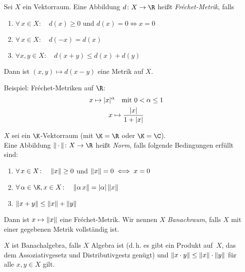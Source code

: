 \begin{thEmpty}
    Sei $X$ ein Vektorraum. Eine Abbildung $d\colon X\to\R$ heißt
    \emph{Fr\'echet-Metrik}, falls
    \begin{enumerate}[({F}1),leftmargin=2cm]
        \item
            $\forall\,x\in X\colon\quad 
            d(x) \geq 0$ und $d(x)=0 \iff x=0$
        \item
            $\forall\,x\in X\colon\quad
            d(-x) = d(x)$
        \item
            $\forall x,y\in X\colon\quad d(x+y) \leq d(x) + d(y)$
    \end{enumerate}
    Dann ist $(x,y)\mapsto d(x-y)$ eine Metrik auf $X$.

    Beispiel: Fr\'echet-Metriken auf $\R$:
    \begin{gather*}
        x\mapsto \lvert x\rvert^\alpha \quad\text{mit $0<\alpha\leq1$}
        \\
        x\mapsto \frac{\lvert x\rvert}{1+\lvert x\rvert}
    \end{gather*}
\end{thEmpty}


\begin{thEmpty}[Norm]
    $X$ sei ein $\K$-Vektorraum (mit $\K=\R$ oder $\K=\C$).\\
    Eine Abbildung $\emptyNorm\colon X\to\R$ heißt \emph{Norm}, falls folgende
    Bedingungen erfüllt sind:
    \begin{enumerate}[({N}1),leftmargin=2cm]
        \item 
            $\forall\,x\in X\colon\quad
            \lVert x\rVert\geq 0$ und $\lVert x\rVert=0 \iff x=0$
        \item
            $\forall\,\alpha\in\K,x\in X\colon\quad
            \norm{\alpha\,x} = \abs\alpha \, \norm x$
        \item
            $\lVert x+y\rVert \leq \lVert x\rVert + \lVert y\rVert$
    \end{enumerate}
    Dann ist $x\mapsto\lVert x\rVert$ eine Fr\'echet-Metrik. Wir nennen $X$
    \emph{Banachraum}, falls $X$ mit einer gegebenen Metrik vollständig ist.
\end{thEmpty}

$X$ ist Banachalgebra, falls $X$ Algebra ist (d.\,h. es gibt ein Produkt
auf~$X$, das dem Assoziativgesetz und Distributivgestz genügt) und 
$\lVert x\cdot y\rVert \leq \lVert x\rVert \cdot \lVert y\rVert$ für alle $x,y\in X$ gilt.

